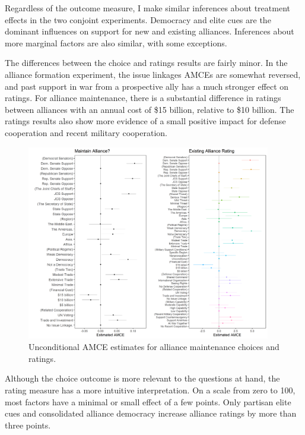 \documentclass[12pt]{article}
\begin{document}
Regardless of the outcome measure, I make similar inferences about treatment effects in the two conjoint experiments. 
Democracy and elite cues are the dominant influences on support for new and existing alliances. 
Inferences about more marginal factors are also similar, with some exceptions. 


The differences between the choice and ratings results are fairly minor. 
In the alliance formation experiment, the issue linkages AMCEs are somewhat reversed, and past support in war from a prospective ally has a much stronger effect on ratings. 
For alliance maintenance, there is a substantial difference in ratings between alliances with an annual cost of \$15 billion, relative to \$10 billion. 
The ratings results also show more evidence of a small positive impact for defense cooperation and recent military cooperation. 



\begin{figure}
	\centering
		\includegraphics[width=0.95\textwidth]{maintenance-plots.png}
	\caption{Unconditional AMCE estimates for alliance maintenance choices and ratings.}
	\label{fig:maintenance-plots}
\end{figure}


Although the choice outcome is more relevant to the questions at hand, the rating measure has a more intuitive interpretation. 
On a scale from zero to 100, most factors have a minimal or small effect of a few points. 
Only partisan elite cues and consolidated alliance democracy increase alliance ratings by more than three points. 
\end{document}
